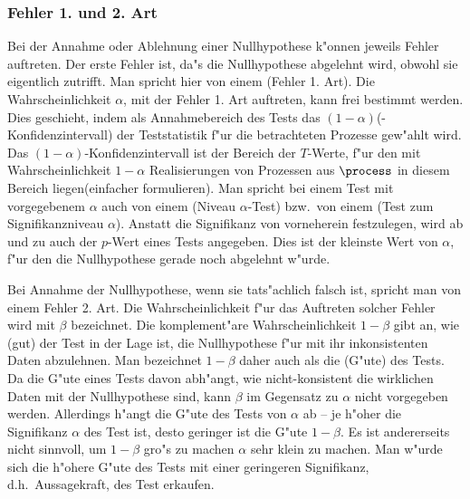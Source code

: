 \subsubsection{Fehler 1. und 2. Art}
Bei der Annahme oder Ablehnung einer Nullhypothese k"onnen jeweils Fehler auftreten. Der
erste Fehler ist, da"s die Nullhypothese abgelehnt wird, obwohl sie eigentlich zutrifft.
Man spricht hier von einem \begriff(Fehler 1. Art). Die Wahrscheinlichkeit $\alpha$, mit
der Fehler 1. Art auftreten, kann frei bestimmt werden. Dies geschieht, indem als
Annahmebereich des Tests das $(1-\alpha)$\begriff(-Konfidenzintervall) der Teststatistik
f"ur die betrachteten Prozesse gew"ahlt wird. Das $(1-\alpha)$-Konfidenzintervall ist der
Bereich der $T$-Werte, f"ur den mit Wahrscheinlichkeit $1-\alpha$ Realisierungen von
Prozessen aus $\process$ in diesem Bereich liegen\korrektur(einfacher formulieren).  Man
spricht bei einem Test mit vorgegebenem $\alpha$ auch von einem \begriff(Niveau
$\alpha$-Test) bzw.\ von einem \begriff(Test zum Signifikanzniveau $\alpha$). Anstatt die
Signifikanz von vorneherein festzulegen, wird ab und zu auch der $p$-Wert eines Tests
angegeben. Dies ist der kleinste Wert von $\alpha$, f"ur den die Nullhypothese gerade noch
abgelehnt w"urde.

Bei Annahme der Nullhypothese, wenn sie tats"achlich falsch ist, spricht man von einem
Fehler 2. Art.  Die Wahrscheinlichkeit f"ur das Auftreten solcher Fehler wird mit $\beta$
bezeichnet. Die komplement"are Wahrscheinlichkeit $1-\beta$ gibt an, wie \naja(gut) der
Test in der Lage ist, die Nullhypothese f"ur mit ihr inkonsistenten Daten abzulehnen. Man
bezeichnet $1-\beta$ daher auch als die \begriff(G"ute) des Tests.  Da die G"ute eines
Tests davon abh"angt, wie nicht-konsistent die wirklichen Daten mit der Nullhypothese
sind, kann $\beta$ im Gegensatz zu $\alpha$ nicht vorgegeben werden.  Allerdings h"angt
die G"ute des Tests von $\alpha$ ab -- je h"oher die Signifikanz $\alpha$ des Test ist,
desto geringer ist die G"ute $1-\beta$. Es ist andererseits nicht sinnvoll, um $1-\beta$
gro"s zu machen $\alpha$ sehr klein zu machen. Man w"urde sich die h"ohere G"ute des Tests
mit einer geringeren Signifikanz, d.h.\ Aussagekraft, des Test erkaufen.

